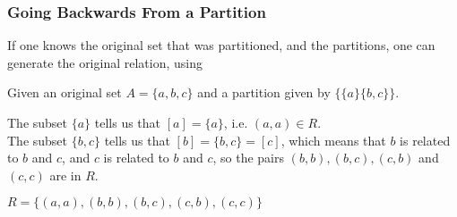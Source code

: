 \documentclass[\main/notes.tex]{subfiles}
\begin{document}
				\subsubsection{Going Backwards From a Partition}
					If one knows the original set that was partitioned, and the partitions, one can generate the original relation, using 
					\begin{example}
						Given an original set $A = \{a, b, c\}$ and a partition given by $\bigl\{\{a\} \{b, c\}\bigr\}$.
						\begin{indentparagraph}
							The subset $\{a\}$ tells us that $[a] = \{a\}$, i.e. $(a, a) \in R$.\\
							The subset $\{b, c\}$ tells us that $[b] = \{b, c\} = [c]$, which means that $b$ is related to $b$ and $c$, and $c$ is related to $b$ and $c$, so the pairs $(b, b), (b, c), (c, b)$ and $(c, c)$ are in $R$.
						\end{indentparagraph}
						$R = \bigl\{(a, a), (b, b), (b, c), (c, b), (c, c)\bigr\}$
					\end{example}
					\pagebreak
\end{document}

